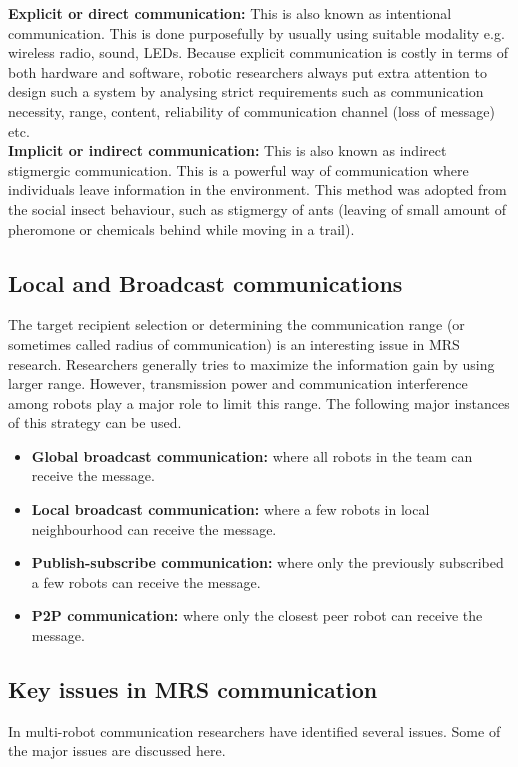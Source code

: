 \textbf{Explicit or direct communication:}
This is also known as intentional communication. This is done purposefully by usually using suitable modality e.g. wireless radio, sound, LEDs. Because explicit communication is costly in terms of both hardware and software, robotic researchers always put extra attention to design such a system by analysing strict requirements such as communication necessity, range, content, reliability of communication channel (loss of message) etc.\\

\textbf{Implicit or indirect communication:} 
This is also known as indirect stigmergic communication. This is a powerful way of communication where individuals leave information in the environment. This method was adopted from the social insect behaviour, such as stigmergy of ants (leaving of small amount of pheromone or chemicals behind while moving in a trail). 
\subsection*{Local and Broadcast communications}
The target recipient selection or determining the communication range (or sometimes called radius of communication) is an interesting issue in MRS research. Researchers generally tries to maximize the information gain by using larger range. However, transmission power and communication interference among robots play a major role to limit this range. The following major instances of this strategy can be used.
\begin{itemize}
\item \textbf{Global broadcast communication:} where all robots in the team can receive the message.
\item \textbf{Local broadcast communication:} where a few robots in local neighbourhood can receive the message.
\item \textbf{Publish-subscribe communication:} where only the previously subscribed a few robots can receive the message.
\item \textbf{P2P communication:} where only the closest peer robot can receive the message.
\end{itemize}
\subsection{Key issues in MRS communication}
\label{bg:mrs-comm:key-issues}
In multi-robot communication researchers have identified several issues. Some of the major issues are discussed here.
